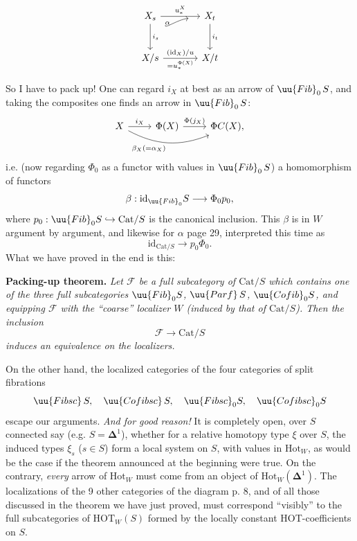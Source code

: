 
\[
\begin{tikzcd}[row sep=large, column sep=large]
X_s \arrow[r, "u_*^X"] \arrow[d, "i_s"] & X_t \arrow[d, "i_t"] \\
X/s \arrow[r, "(\mathrm{id}_X)/u", "= u_*^{\Phi(X)}"'] \arrow[ur, bend left=30, shorten <=28pt, shorten >=12pt, "\alpha"] & X/t
\end{tikzcd}
\]

So I have to pack up! One can regard $i_X$ at best as an arrow of $\uu{Fib}_0\, S$, and taking the composites one finds an arrow in $\uu{Fib}_0\, S$:
\[
\begin{tikzcd}
X \arrow[r, "i_X"] \arrow[rr, bend right=25, "\beta_X(=\alpha_X)"'] & \Phi(X) \arrow[r, "\Phi(j_X)"] & \Phi C(X),
\end{tikzcd}
\]
i.e. (now regarding $\Phi_0$ as a functor with values in $\uu{Fib}_0\, S$) a homomorphism of functors
\[
\beta : \mathrm{id}_{\uu{Fib}_0} S \longrightarrow \Phi_0 p_0, %
\]
where $p_0 : \uu{Fib}_0 S \hookrightarrow \mathrm{Cat}/S$ is the canonical inclusion. This $\beta$ is in $W$ argument by argument, and likewise for $\alpha$ page 29, interpreted this time as
\[
\mathrm{id}_{\mathrm{Cat}/S} \longrightarrow p_0\Phi_0.
\]
What we have proved in the end is this:

\textbf{Packing-up theorem.} \textit{Let $\mathcal{F}$ be a full subcategory of $\mathrm{Cat}/S$ which contains one of the three full subcategories $\uu{Fib}_0 S$, $\uu{Parf}\, S$, $\uu{Cofib}_0 S$, and equipping $\mathcal{F}$ with the ``coarse'' localizer $W$ (induced by that of $\mathrm{Cat}/S$). Then the inclusion}
\[
\mathcal{F} \longrightarrow \mathrm{Cat}/S
\]
\textit{induces an equivalence on the localizers.}

On the other hand, the localized categories of the four categories of split fibrations
\[
\uu{Fibsc}\, S, \quad \uu{Cofibsc}\, S, \quad \uu{Fibsc}_0 S, \quad \uu{Cofibsc}_0 S
\]
escape our arguments. \textit{And for good reason!} It is completely open, over $S$ connected say (e.g. $S = \mathbf{\Delta}^1$), whether for a relative homotopy type $\xi$ over $S$, the induced types $\xi_s$ ($s \in S$) form a local system on $S$, with values in $\mathrm{Hot}_W$, as would be the case if the theorem announced at the beginning were true. On the contrary, \textit{every} arrow of $\mathrm{Hot}_W$ must come from an object of $\mathrm{Hot}_W(\mathbf{\Delta}^1)$. The localizations of the 9 other categories of the diagram p. 8, and of all those discussed in the theorem we have just proved, must correspond ``visibly'' to the full subcategories of $\mathrm{HOT}_W(S)$ formed by the locally constant HOT-coefficients on $S$.

